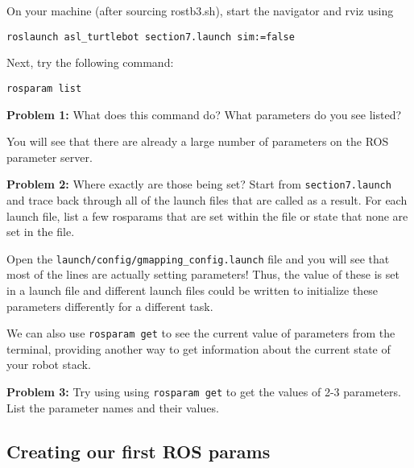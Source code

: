 \documentclass{article}
\begin{document}
On your machine (after sourcing rostb3.sh), start the navigator and rviz using
\begin{lstlisting}
roslaunch asl_turtlebot section7.launch sim:=false
\end{lstlisting}

Next, try the following command:
\begin{lstlisting}
rosparam list
\end{lstlisting}
\textbf{Problem 1:} What does this command do? What parameters do you see listed?

You will see that there are already a large number of parameters on the ROS parameter server. 

\textbf{Problem 2: } Where exactly are those being set? Start from \texttt{section7.launch} and trace back through all of the launch files that are called as a result. For each launch file, list a few rosparams that are set within the file or state that none are set in the file.

Open the \texttt{launch/config/gmapping\_config.launch} file and you will see that most of the lines are actually setting parameters! Thus, the value of these is set in a launch file and different launch files could be written to initialize these parameters differently for a different task.

We can also use \texttt{rosparam get} to see the current value of parameters from the terminal, providing another way to get information about the current state of your robot stack. 

\textbf{Problem 3: } Try using using \texttt{rosparam get} to get the values of 2-3 parameters. List the parameter names and their values.

\subsection{Creating our first ROS params}
\end{document}
